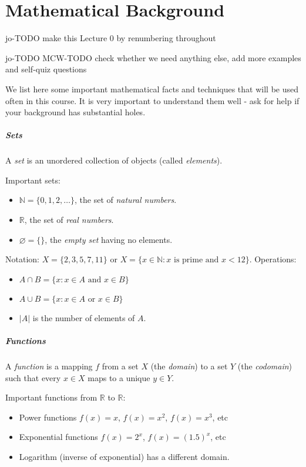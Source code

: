 \chapter{Mathematical Background}
\label{ch:app:mathtools}

jo-TODO make this Lecture 0 by renumbering throughout

jo-TODO
MCW-TODO check whether we need anything else, add more examples and self-quiz questions

We list here some important mathematical facts and techniques  that will be used often in this course. It is very important to understand them well - ask for help if your background has substantial holes.

\paragraph{Sets}

A \emph{set} is an unordered collection of objects (called \emph{elements}).

Important sets: 
\begin{itemize}
\item $\mathbb{N} = \{0,1,2,\dots \}$, the set of \emph{natural numbers}.
\item $\mathbb{R}$, the set of \emph{real numbers}.
\item $\varnothing = \{\}$, the \emph{empty set} having no elements.
\end{itemize}

Notation: $X = \{2,3,5,7,11\}$ or $X = \{x\in \mathbb{N} : \text{$x$ is prime and $x< 12$}\}$.
Operations: 
\begin{itemize}
\item $A\cap B = \{x: x\in A \text{ and } x\in B\}$
\item $A\cup B = \{x: x\in A \text{ or  } x\in B\}$
\item $|A|$ is the number of elements of $A$.
\end{itemize}


\paragraph{Functions}

A \emph{function} is a mapping $f$ from a set $X$ (the \emph{domain}) to a set $Y$ (the \emph{codomain}) such that every $x\in X$ maps to a unique $y\in Y$.

Important functions from $\mathbb{R}$ to $\mathbb{R}$: 
\begin{itemize}
\item Power functions $f(x) = x$, $f(x) = x^2$, $f(x) = x^3$, etc
\item Exponential functions $f(x) = 2^x$, $f(x) = (1.5)^x$, etc
\item Logarithm (inverse of exponential) has a different domain.
\end{itemize}

